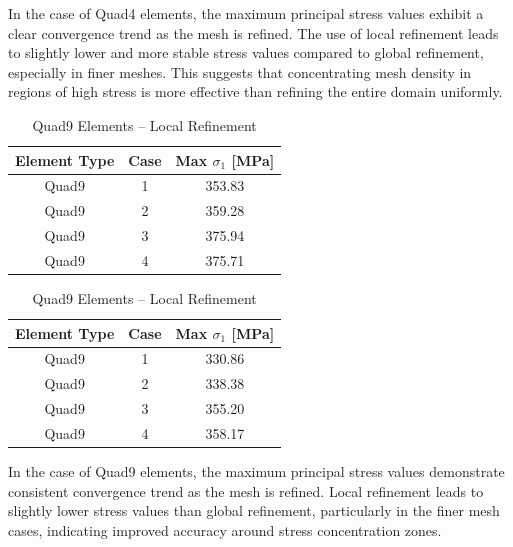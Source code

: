 \documentclass[12pt]{article}
\begin{document}
In the case of Quad4 elements, the maximum principal stress values exhibit a clear convergence trend as the mesh is refined. The use of local refinement leads to slightly lower and more stable stress values compared to global refinement, especially in finer meshes. This suggests that concentrating mesh density in regions of high stress is more effective than refining the entire domain uniformly.

\begin{table}[H]
\centering
\begin{minipage}{0.48\textwidth}
\centering
\begin{tabular}{|c|c|c|}
\hline
\textbf{Element Type} & \textbf{Case} & \textbf{Max $\sigma_1$ [MPa]} \\
\hline
Quad9 & 1 & 353.83 \\
Quad9 & 2 & 359.28 \\
Quad9 & 3 & 375.94 \\
Quad9 & 4 & 375.71 \\
\hline
\end{tabular}
\caption{Quad9 Elements – Global Refinement}
\label{tab:quad9_global}
\end{minipage}
\hfill
\begin{minipage}{0.48\textwidth}
\centering
\begin{tabular}{|c|c|c|}
\hline
\textbf{Element Type} & \textbf{Case} & \textbf{Max $\sigma_1$ [MPa]} \\
\hline
Quad9 & 1 & 330.86 \\
Quad9 & 2 & 338.38 \\
Quad9 & 3 & 355.20 \\
Quad9 & 4 & 358.17 \\
\hline
\end{tabular}
\caption{Quad9 Elements – Local Refinement}
\label{tab:quad9_local}
\end{minipage}
\end{table}

In the case of Quad9 elements, the maximum principal stress values demonstrate consistent convergence trend as the mesh is refined. Local refinement leads to slightly lower stress values than global refinement, particularly in the finer mesh cases, indicating improved accuracy around stress concentration zones.
\end{document}
